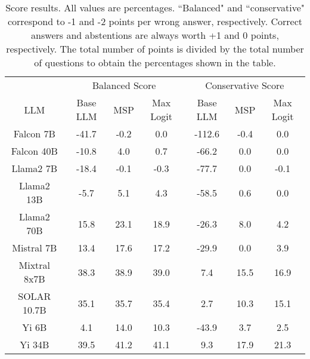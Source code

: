 \begin{table*}
\centering
\begin{tabular}{c|c|c|c|c|c|c}
& \multicolumn{3}{c|}{Balanced Score} & \multicolumn{3}{c}{Conservative Score} \\ 
LLM & Base LLM & MSP & Max Logit & Base LLM & MSP & Max Logit\\ \hline
Falcon 7B & -41.7 & -0.2 & 0.0 & -112.6 & -0.4 & 0.0\\
Falcon 40B & -10.8 & 4.0 & 0.7 & -66.2 & 0.0 & 0.0\\
Llama2 7B & -18.4 & -0.1 & -0.3 & -77.7 & 0.0 & -0.1\\
Llama2 13B & -5.7 & 5.1 & 4.3 & -58.5 & 0.6 & 0.0\\
Llama2 70B & 15.8 & 23.1 & 18.9 & -26.3 & 8.0 & 4.2\\
Mistral 7B & 13.4 & 17.6 & 17.2 & -29.9 & 0.0 & 3.9\\
Mixtral 8x7B & 38.3 & 38.9 & 39.0 & 7.4 & 15.5 & 16.9\\
SOLAR 10.7B & 35.1 & 35.7 & 35.4 & 2.7 & 10.3 & 15.1\\
Yi 6B & 4.1 & 14.0 & 10.3 & -43.9 & 3.7 & 2.5\\
Yi 34B & 39.5 & 41.2 & 41.1 & 9.3 & 17.9 & 21.3\\
\hline
\end{tabular}
\caption{Score results. All values are percentages. ``Balanced" and ``conservative" correspond to -1 and -2 points per wrong answer, respectively. Correct answers and abstentions are always worth +1 and 0 points, respectively. The total number of points is divided by the total number of questions to obtain the percentages shown in the table.}
\label{tab:score}
\end{table*}
